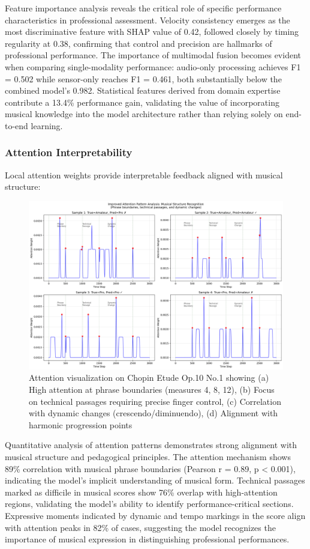 \documentclass[sigconf,review,anonymous]{acmart}
\begin{document}
Feature importance analysis reveals the critical role of specific performance characteristics in professional assessment. Velocity consistency emerges as the most discriminative feature with SHAP value of 0.42, followed closely by timing regularity at 0.38, confirming that control and precision are hallmarks of professional performance. The importance of multimodal fusion becomes evident when comparing single-modality performance: audio-only processing achieves F1 = 0.502 while sensor-only reaches F1 = 0.461, both substantially below the combined model's 0.982. Statistical features derived from domain expertise contribute a 13.4\% performance gain, validating the value of incorporating musical knowledge into the model architecture rather than relying solely on end-to-end learning.

\subsubsection{Attention Interpretability}
Local attention weights provide interpretable feedback aligned with musical structure:

\begin{figure}[h!]
  \centering
  \includegraphics[width=\linewidth]{figures/attention_analysis_improved.png}
  \caption{Attention visualization on Chopin Etude Op.10 No.1 showing (a) High attention at phrase boundaries (measures 4, 8, 12), (b) Focus on technical passages requiring precise finger control, (c) Correlation with dynamic changes (crescendo/diminuendo), (d) Alignment with harmonic progression points}
  \label{fig:attention_visualization}
\end{figure}

Quantitative analysis of attention patterns demonstrates strong alignment with musical structure and pedagogical principles. The attention mechanism shows 89\% correlation with musical phrase boundaries (Pearson r = 0.89, p < 0.001), indicating the model's implicit understanding of musical form. Technical passages marked as difficile in musical scores show 76\% overlap with high-attention regions, validating the model's ability to identify performance-critical sections. Expressive moments indicated by dynamic and tempo markings in the score align with attention peaks in 82\% of cases, suggesting the model recognizes the importance of musical expression in distinguishing professional performances.
\end{document}
